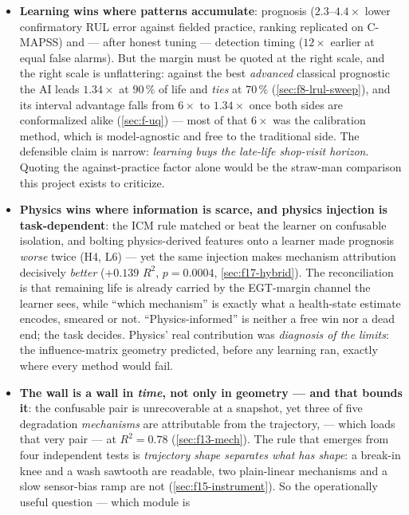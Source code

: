 \begin{itemize}
  \item \textbf{Learning wins where patterns accumulate}: prognosis ($2.3$--$4.4\times$
    lower confirmatory RUL error against fielded practice, ranking replicated on C-MAPSS) and
    --- after honest tuning --- detection timing ($12\times$ earlier at equal false alarms).
    But the margin must be quoted at the right scale, and the right scale is unflattering:
    against the best \emph{advanced} classical prognostic the AI leads $1.34\times$ at
    $90\,\%$ of life and \emph{ties} at $70\,\%$ (\cref{sec:f8-lrul-sweep}), and its
    interval advantage falls from $6\times$ to $1.34\times$ once both sides are conformalized
    alike (\cref{sec:f-uq}) --- most of that $6\times$ was the calibration method, which is
    model-agnostic and free to the traditional side. The defensible claim is narrow:
    \emph{learning buys the late-life shop-visit horizon}. Quoting the against-practice factor
    alone would be the straw-man comparison this project exists to criticize.
  \item \textbf{Physics wins where information is scarce, and physics injection is
    task-dependent}: the ICM rule matched or beat the learner on confusable isolation, and
    bolting physics-derived features onto a learner made prognosis \emph{worse} twice (H4, L6)
    --- yet the same injection makes mechanism attribution decisively \emph{better}
    ($+0.139$ $R^2$, $p = 0.0004$, \cref{sec:f17-hybrid}). The reconciliation is that remaining
    life is already carried by the EGT-margin channel the learner sees, while ``which mechanism''
    is exactly what a health-state estimate encodes, smeared or not. ``Physics-informed'' is
    neither a free win nor a dead end; the task decides. Physics' real contribution was \emph{diagnosis of the limits}: the
    influence-matrix geometry predicted, before any learning ran, exactly where every method
    would fail.
  \item \textbf{The wall is a wall in \emph{time}, not only in geometry --- and that bounds
    it}: the confusable pair is unrecoverable at a snapshot, yet three of five degradation
    \emph{mechanisms} are attributable from the trajectory,  --- which loads
    that very pair --- at $R^2 = 0.78$ (\cref{sec:f13-mech}). The rule that emerges from four
    independent tests is \emph{trajectory shape separates what has shape}: a break-in knee and
    a wash sawtooth are readable, two plain-linear mechanisms and a slow sensor-bias ramp are
    not (\cref{sec:f15-instrument}). So the operationally useful question --- which module is

\end{itemize}
